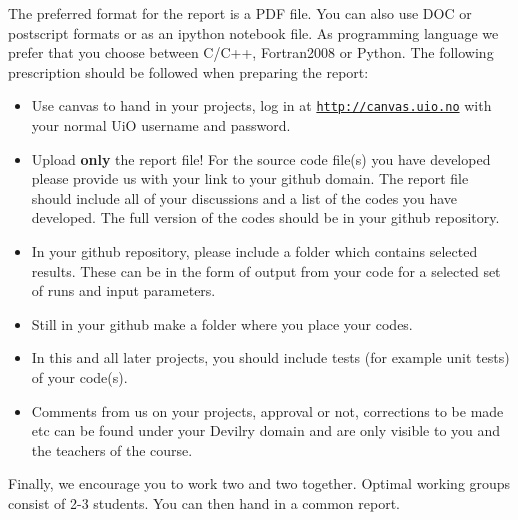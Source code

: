 \documentclass[%
oneside,                 %
final,                   %
10pt]{article}
\begin{document}
The preferred format for the report is a PDF file. You can also use DOC or postscript formats or as an ipython notebook file.  As programming language we prefer that you choose between C/C++, Fortran2008 or Python. The following prescription should be followed when preparing the report:

\begin{itemize}
  \item Use canvas to hand in your projects, log in  at  \href{{http://canvas.uio.no}}{\nolinkurl{http://canvas.uio.no}} with your normal UiO username and password.

  \item Upload \textbf{only} the report file!  For the source code file(s) you have developed please provide us with your link to your github domain.  The report file should include all of your discussions and a list of the codes you have developed.  The full version of the codes should be in your github repository.

  \item In your github repository, please include a folder which contains selected results. These can be in the form of output from your code for a selected set of runs and input parameters.

  \item Still in your github make a folder where you place your codes. 

  \item In this and all later projects, you should include tests (for example unit tests) of your code(s).

  \item Comments  from us on your projects, approval or not, corrections to be made  etc can be found under your Devilry domain and are only visible to you and the teachers of the course.
\end{itemize}

\noindent
Finally, 
we encourage you to work two and two together. Optimal working groups consist of 
2-3 students. You can then hand in a common report. 


\end{document}
